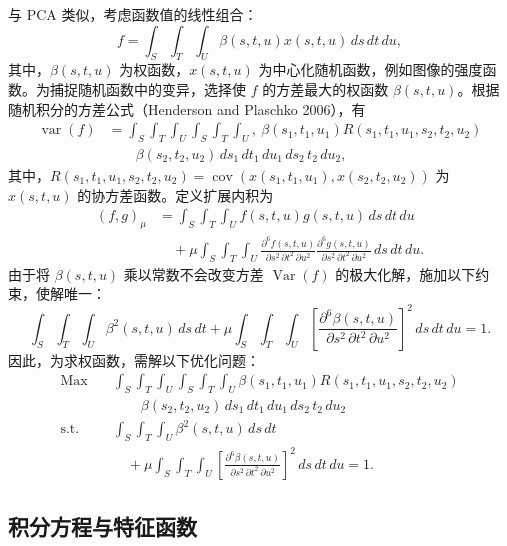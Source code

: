 与 PCA 类似，考虑函数值的线性组合：
\begin{equation}
f=\int_S\int_T\int_U\beta(s,t,u)x(s,t,u)\,ds\,dt\,du,
\tag{6.152}
\end{equation}
其中，$\beta(s,t,u)$ 为权函数，$x(s,t,u)$ 为中心化随机函数，例如图像的强度函数。为捕捉随机函数中的变异，选择使 $f$ 的方差最大的权函数 $\beta(s,t,u)$。根据随机积分的方差公式（Henderson and Plaschko 2006），有
\begin{equation}
\begin{aligned}
\operatorname{var}(f)&=\int_S\int_T\int_U\int_S\int_T\int_U,\ \beta(s_1,t_1,u_1)R(s_1,t_1,u_1,s_2,t_2,u_2)\\
&\qquad\beta(s_2,t_2,u_2)\,ds_1\,dt_1\,du_1\,ds_2\,t_2\,du_2,
\end{aligned}\tag{6.153}
\end{equation}
其中，$R(s_1,t_1,u_1,s_2,t_2,u_2)=\operatorname{cov}(x(s_1,t_1,u_1),x(s_2,t_2,u_2))$ 为 $x(s,t,u)$ 的协方差函数。定义扩展内积为
\[
\begin{aligned}
(f,g)_\mu&=\int_S\int_T\int_U f(s,t,u)g(s,t,u)\,ds\,dt\,du\\
&\quad+\mu\int_S\int_T\int_U\frac{\partial^6 f(s,t,u)}{\partial s^2\,\partial t^2\,\partial u^2}
\frac{\partial^6 g(s,t,u)}{\partial s^2\,\partial t^2\,\partial u^2}\,ds\,dt\,du.
\end{aligned}
\]
由于将 $\beta(s,t,u)$ 乘以常数不会改变方差 $\operatorname{Var}(f)$ 的极大化解，施加以下约束，使解唯一：
\begin{equation}
\int_S\int_T\int_U\beta^2(s,t,u)\,ds\,dt+\mu\int_S\int_T\int_U
\left[\frac{\partial^6\beta(s,t,u)}{\partial s^2\,\partial t^2\,\partial u^2}\right]^2\,ds\,dt\,du=1.
\tag{6.154}
\end{equation}
因此，为求权函数，需解以下优化问题：
\begin{equation}
\begin{aligned}
\operatorname{Max}\quad&\int_S\int_T\int_U\int_S\int_T\int_U\beta(s_1,t_1,u_1)R(s_1,t_1,u_1,s_2,t_2,u_2)\\
&\qquad\beta(s_2,t_2,u_2)\,ds_1\,dt_1\,du_1\,ds_2\,t_2\,du_2\\
\text{s.t.}\quad&\int_S\int_T\int_U\beta^2(s,t,u)\,ds\,dt\\
&\quad+\mu\int_S\int_T\int_U\left[\frac{\partial^6\beta(s,t,u)}{\partial s^2\,\partial t^2\,\partial u^2}\right]^2\,ds\,dt\,du=1.
\end{aligned}\tag{6.155}
\end{equation}

\subsection{积分方程与特征函数}

